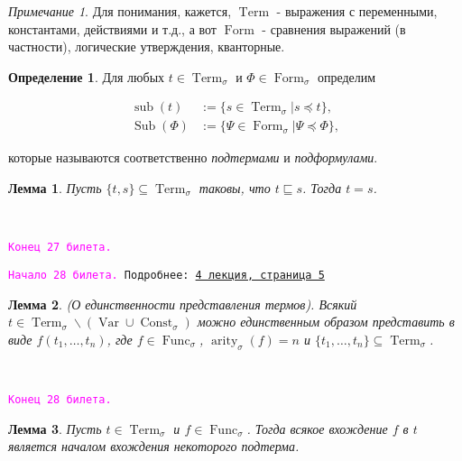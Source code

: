 \documentclass[a4paper,100pt]{article}
\theoremstyle{indented}
\newtheorem{lemma}{Лемма}
\theoremstyle{definition}
\newtheorem{defn}{Определение}
\theoremstyle{remark}
\newtheorem{remark}{Примечание}
\DeclareMathOperator{\form}{Form}
\DeclareMathOperator{\Func}{Func}
\DeclareMathOperator{\Const}{Const}
\DeclareMathOperator{\arity}{arity}
\DeclareMathOperator{\Var}{Var}
\DeclareMathOperator{\Term}{Term}
\DeclareMathOperator{\sub}{sub}
\DeclareMathOperator{\Sub}{Sub}
\begin{document}
\begin{remark}
  Для понимания, кажется, $\Term$ - выражения с переменными, константами, действиями и т.д., а вот $\form$ - сравнения выражений (в частности), логические утверждения, кванторные.
\end{remark}

\begin{defn}
  Для любых $t\in \Term_\sigma$ и $\Phi\in \form_\sigma$ определим 

  \begin{equation*}
    \begin{aligned}
      \sub(t) & := \{s \in \Term_\sigma | s\preccurlyeq t\}, \\
      \Sub(\Phi) & := \{\Psi \in \form_\sigma | \Psi\preccurlyeq \Phi\}, 
    \end{aligned}
  \end{equation*}

  которые называются соответственно \textit{подтермами} и \textit{подформулами}.
\end{defn}

\begin{lemma}
  Пусть $\{t, s\}\subseteq \Term_\sigma$ таковы, что $t\sqsubseteq s$. Тогда $t=s$. 
\end{lemma} \

\texttt{\textcolor{magenta}{Конец 27 билета.}} 

\hrulefill

\texttt{\hypertarget{b28}{\textcolor{magenta}{Начало 28 билета.}} Подробнее: \href{http://www.mi-ras.ru/~speranski/courses/logic-1-2021-spring/slides_4.pdf}{4 лекция, страница 5}} \\

\begin{lemma}
  (О единственности представления термов). Всякий $t\in \Term_\sigma \backslash (\Var\cup\Const_\sigma)$ можно единственным образом представить в виде $f(t_1, \ldots, t_n)$, где $f\in \Func_\sigma$, $\arity_\sigma(f)=n$ и $\{t_1, \ldots, t_n\}\subseteq \Term_\sigma$. 
\end{lemma} \

\texttt{\textcolor{magenta}{Конец 28 билета.}} 

\hrulefill

\begin{lemma}
  Пусть $t\in \Term_\sigma$ и $f\in \Func_\sigma$. Тогда всякое вхождение $f$ в $t$ является началом вхождения некоторого подтерма.
\end{lemma} 

\hrulefill
\end{document}
